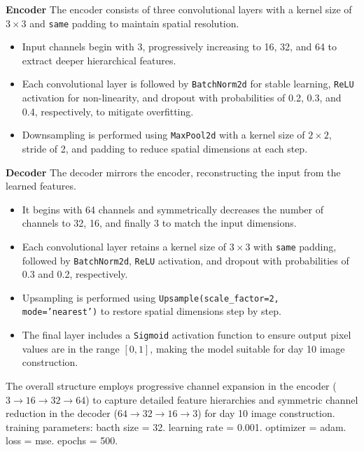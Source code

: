   \textbf{Encoder}
  The encoder consists of three convolutional layers with a kernel size of $3 \times 3$ and \texttt{same} padding to maintain spatial resolution.  
  \begin{itemize}
      \item Input channels begin with 3, progressively increasing to 16, 32, and 64 to extract deeper hierarchical features.  
      \item Each convolutional layer is followed by \texttt{BatchNorm2d} for stable learning, \texttt{ReLU} activation for non-linearity, and dropout with probabilities of 0.2, 0.3, and 0.4, respectively, to mitigate overfitting.  
      \item Downsampling is performed using \texttt{MaxPool2d} with a kernel size of $2 \times 2$, stride of 2, and padding to reduce spatial dimensions at each step.  
  \end{itemize}
  
  \textbf{Decoder}
  The decoder mirrors the encoder, reconstructing the input from the learned features.  
  \begin{itemize}
      \item It begins with 64 channels and symmetrically decreases the number of channels to 32, 16, and finally 3 to match the input dimensions.  
      \item Each convolutional layer retains a kernel size of $3 \times 3$ with \texttt{same} padding, followed by \texttt{BatchNorm2d}, \texttt{ReLU} activation, and dropout with probabilities of 0.3 and 0.2, respectively.  
      \item Upsampling is performed using \texttt{Upsample(scale\_factor=2, mode='nearest')} to restore spatial dimensions step by step.  
      \item The final layer includes a \texttt{Sigmoid} activation function to ensure output pixel values are in the range $[0, 1]$, making the model suitable for 
      day 10 image construction.  
  \end{itemize}
  

The overall structure employs progressive channel expansion in the encoder (\(3 \to 16 \to 32 \to 64\)) to capture detailed feature hierarchies and symmetric 
channel reduction in the decoder (\(64 \to 32 \to 16 \to 3\)) for day 10 image construction. 
training parameters: bacth size = 32. learning rate = 0.001. optimizer = adam. loss = mse. epochs = 500. 



